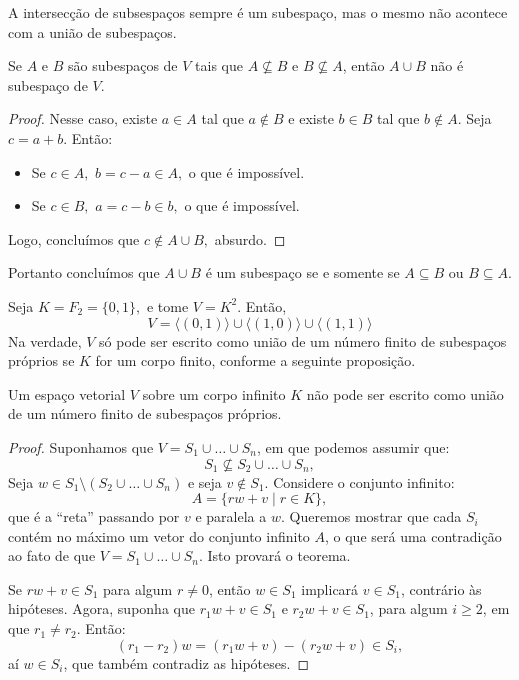 \documentclass[11pt,twoside,a4paper]{book}
\begin{document}
\noindent
A intersecção de subsespaços sempre é um subespaço, mas o mesmo não acontece com a união de subespaços.
\begin{proposicao}\label{unotsubsp}
Se $A$ e $B$ são subespaços de $V$ tais que $A\nsubseteq B$ e $B\nsubseteq A$, então $A\cup B$ não é subespaço de $V$.
\end{proposicao}
\begin{proof}
Nesse caso, existe $a\in A$ tal que $a\notin B$ e existe $b\in B$ tal que $b\notin A$. Seja $c=a+b$. Então:
\begin{itemize}
    \item Se $c \in A,$ $b = c - a \in A,$ o que é impossível.
    \item Se $c \in B,$ $a = c - b \in b,$ o que é impossível.
\end{itemize}
Logo, concluímos que $c \notin A \cup B,$ absurdo. \qedhere
\end{proof}

\noindent
Portanto concluímos que $A \cup B$ é um subespaço se e somente se $A \subseteq B$ ou $B \subseteq A.$

\begin{observacao}
Seja $K = F_2 = \{ 0, 1 \},$ e tome $V = K^2.$ Então,
\[
V = \langle (0,1) \rangle \cup \langle (1,0) \rangle \cup \langle (1,1) \rangle
\]
Na verdade, $V$ só pode ser escrito como união de um número finito de subespaços próprios se $K$ for um corpo finito, conforme a seguinte proposição.
\end{observacao}

\begin{proposicao}
Um espaço vetorial $V$ sobre um corpo infinito $K$ não pode ser escrito como união de um número finito de subespaços próprios.
\end{proposicao}
\begin{proof}
Suponhamos que $V=S_1\cup\dots\cup S_n$, em que podemos assumir que:
\[
S_1\nsubseteq S_2\cup\dots\cup S_n,
\]
Seja $w\in S_1 \setminus (S_2\cup\dots\cup S_n)$ e seja $v\notin S_1$. Considere o conjunto infinito:
\[
A=\{rw+v\mid r\in K\},
\]
que é a ``reta'' passando por $v$ e paralela a $w$. Queremos mostrar que cada $S_i$
contém no máximo um vetor do conjunto infinito $A$, o que será uma contradição ao fato de que
$V=S_1\cup\dots\cup S_n$. Isto provará o teorema.

\medskip
\noindent
Se $rw+v\in S_1$ para algum $r\neq 0$, então $w\in S_1$ implicará $v\in S_1$, contrário às hipóteses.
Agora, suponha que $r_1w+v\in S_1$ e $r_2w+v\in S_1$, para algum $i\geq 2$, em que $r_1\neq r_2$.
Então:
\[
(r_1-r_2)w=(r_1w+v)-(r_2w+v)\in S_i,
\]
aí $w\in S_i$, que também contradiz as hipóteses.
\end{proof}
\end{document}
